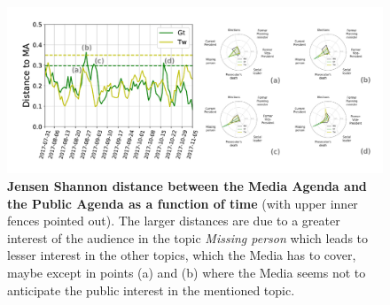 \begin{figure}[h]
\includegraphics[width = \textwidth]{images/Fig4.pdf}
\caption{\textbf{Jensen Shannon distance between the Media Agenda and the Public Agenda as a function of time} (with upper inner fences pointed out). The larger distances are due to a greater interest of the audience in the topic \emph{Missing person} which leads to lesser interest in the other topics, which the Media has to cover, maybe except in points (a) and (b) where the Media seems not to anticipate the public interest in the mentioned topic.}
\label{fig:jensen_shannon_gt}
\end{figure}

